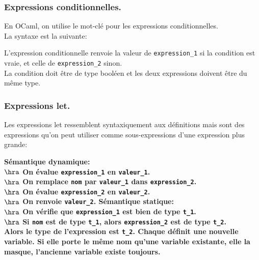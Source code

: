 \documentclass[french, 11pt]{article}
\begin{document}
\subsubsection{Expressions conditionnelles.}

\begin{defi}{}{}
    En OCaml, on utilise le mot-clé  pour les expressions conditionnelles.\\
    La syntaxe est la suivante:
    \begin{center}
    \end{center}
    L'expression conditionnelle renvoie la valeur de \texttt{expression\_1} si la condition est vraie, et celle de \texttt{expression\_2} sinon.\\
    La condition doit être de type booléen et les deux expressions doivent être du même type.
\end{defi}

\subsubsection{Expressions let.}

\begin{defi}{}{}
    Les expressions let ressemblent syntaxiquement aux définitions mais sont des expressions qu'on peut utiliser comme sous-expressions d'une expression plus grande:
    \begin{center}
    \end{center}
    \bf{Sémantique dynamique:}\\
    $\hra$ On évalue \texttt{expression\_1} en \texttt{valeur\_1}.\\
    $\hra$ On remplace \texttt{nom} par \texttt{valeur\_1} dans \texttt{expression\_2}.\\
    $\hra$ On évalue \texttt{expression\_2} en \texttt{valeur\_2}.\\
    $\hra$ On renvoie \texttt{valeur\_2}.\n
    \bf{Sémantique statique:}\\
    $\hra$ On vérifie que \texttt{expression\_1} est bien de type \texttt{t\_1}.\\
    $\hra$ Si \texttt{nom} est de type \texttt{t\_1}, alors \texttt{expression\_2} est de type \texttt{t\_2}.\\
    Alors le type de l'expression est \texttt{t\_2}.\n
    Chaque  définit une nouvelle variable. Si elle porte le même nom qu'une variable existante, elle la masque, l'ancienne variable existe toujours.
\end{defi}
\end{document}
